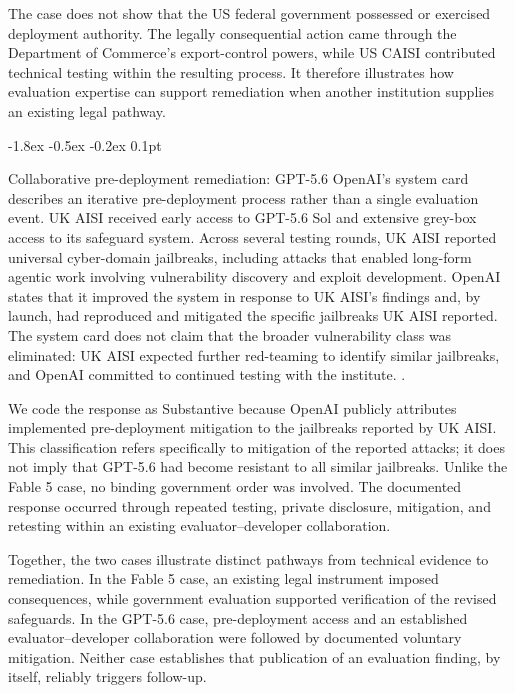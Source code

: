 \documentclass{article}
\makeatletter
\renewcommand{\subsection}{%
  \@startsection{subsection}{2}{\z@}%
                {-1.8ex \@plus -0.5ex \@minus -0.2ex}%
                {0.1pt}%
                {\normalsize\bf\raggedright}%
}
\makeatother
\begin{document}
The case does not show that the US federal government possessed or exercised deployment authority. The legally consequential action came through the Department of Commerce's export-control powers, while US CAISI contributed technical testing within the resulting process. It therefore illustrates how evaluation expertise can support remediation when another institution supplies an existing legal pathway.

\subsection{Collaborative pre-deployment remediation: GPT-5.6}\label{sec:gpt56}
OpenAI's system card describes an iterative pre-deployment process rather than a single evaluation event. UK AISI received early access to GPT-5.6 Sol and extensive grey-box access to its safeguard system. Across several testing rounds, UK AISI reported universal cyber-domain jailbreaks, including attacks that enabled long-form agentic work involving vulnerability discovery and exploit development. OpenAI states that it improved the system in response to UK AISI's findings and, by launch, had reproduced and mitigated the specific jailbreaks UK AISI reported. The system card does not claim that the broader vulnerability class was eliminated: UK AISI expected further red-teaming to identify similar jailbreaks, and OpenAI committed to continued testing with the institute. \citep{openai2026gpt56}.

We code the response as Substantive because OpenAI publicly attributes implemented pre-deployment mitigation to the jailbreaks reported by UK AISI. This classification refers specifically to mitigation of the reported attacks; it does not imply that GPT-5.6 had become resistant to all similar jailbreaks. Unlike the Fable 5 case, no binding government order was involved. The documented response occurred through repeated testing, private disclosure, mitigation, and retesting within an existing evaluator--developer collaboration.

Together, the two cases illustrate distinct pathways from technical evidence to remediation. In the Fable 5 case, an existing legal instrument imposed consequences, while government evaluation supported verification of the revised safeguards. In the GPT-5.6 case, pre-deployment access and an established evaluator--developer collaboration were followed by documented voluntary mitigation. Neither case establishes that publication of an evaluation finding, by itself, reliably triggers follow-up.
\end{document}
